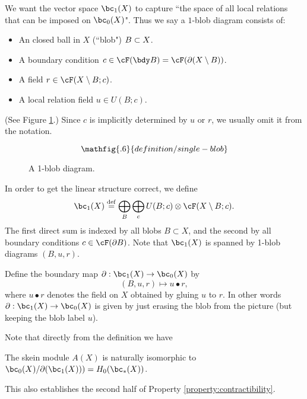 We want the vector space $\bc_1(X)$ to capture 
``the space of all local relations that can be imposed on $\bc_0(X)$".
Thus we say  a $1$-blob diagram consists of:
\begin{itemize}
\item An closed ball in $X$ (``blob") $B \subset X$.
\item A boundary condition $c \in \cF(\bdy B) = \cF(\bd(X \setmin B))$.
\item A field $r \in \cF(X \setmin B; c)$.
\item A local relation field $u \in U(B; c)$.
\end{itemize}
(See Figure \ref{blob1diagram}.) Since $c$ is implicitly determined by $u$ or $r$, we usually omit it from the notation.
\begin{figure}[t]\begin{equation*}
\mathfig{.6}{definition/single-blob}
\end{equation*}\caption{A 1-blob diagram.}\label{blob1diagram}\end{figure}
In order to get the linear structure correct, we define
\[
	\bc_1(X) \deq \bigoplus_B \bigoplus_c U(B; c) \otimes \cF(X \setmin B; c) .
\]
The first direct sum is indexed by all blobs $B\subset X$, and the second
by all boundary conditions $c \in \cF(\bd B)$.
Note that $\bc_1(X)$ is spanned by 1-blob diagrams $(B, u, r)$.

Define the boundary map $\bd : \bc_1(X) \to \bc_0(X)$ by 
\[ 
	(B, u, r) \mapsto u\bullet r, 
\]
where $u\bullet r$ denotes the field on $X$ obtained by gluing $u$ to $r$.
In other words $\bd : \bc_1(X) \to \bc_0(X)$ is given by
just erasing the blob from the picture
(but keeping the blob label $u$).

 
Note that directly from the definition we have
\begin{thm}
\label{thm:skein-modules}
The skein module $A(X)$ is naturally isomorphic to $\bc_0(X)/\bd(\bc_1(X))) = H_0(\bc_*(X))$.
\end{thm}
This also establishes the second 
half of Property \ref{property:contractibility}.

